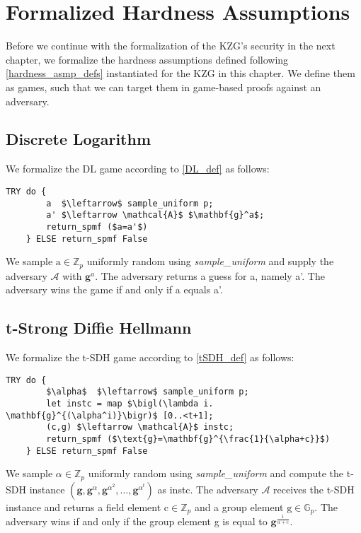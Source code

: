 \chapter{Formalized Hardness Assumptions}\label{chapter:hardness_asmps_frml}
Before we continue with the formalization of the KZG's security in the next chapter, we formalize the hardness assumptions defined following \ref{hardness_asmp_defs} instantiated for the KZG in this chapter. We define them as games, such that we can target them in game-based proofs against an adversary.

\section*{Discrete Logarithm}
We formalize the DL game according to \ref{DL_def} as follows: 
\begin{lstlisting}[language=isabelle]
    TRY do {
        a  $\leftarrow$ sample_uniform p;
        a' $\leftarrow \mathcal{A}$ $\mathbf{g}^a$;
        return_spmf ($a=a'$)
    } ELSE return_spmf False
\end{lstlisting}
We sample $\text{a} \in \mathbb{Z}_p$ uniformly random using \textit{sample\_uniform} and supply the adversary $\mathcal{A}$ with $\mathbf{g}^a$. The adversary returns a guess for a, namely a'. The adversary wins the game if and only if a equals a'.

\section*{t-Strong Diffie Hellmann}
We formalize the t-SDH game according to \ref{tSDH_def} as follows: 
\begin{lstlisting}[language=isabelle]
    TRY do {
        $\alpha$  $\leftarrow$ sample_uniform p;
        let instc = map $\bigl(\lambda i. \mathbf{g}^{(\alpha^i)}\bigr)$ [0..<t+1];
        (c,g) $\leftarrow \mathcal{A}$ instc;
        return_spmf ($\text{g}=\mathbf{g}^{\frac{1}{\alpha+c}}$)
    } ELSE return_spmf False
\end{lstlisting}
We sample $\alpha\in\mathbb{Z}_p$ uniformly random using \textit{sample\_uniform} and compute the t-SDH instance $(\mathbf{g}, \mathbf{g}^{\alpha}, \mathbf{g}^{\alpha^2}, \dots, \mathbf{g}^{\alpha^t})$ as instc. The adversary $\mathcal{A}$ receives the t-SDH instance and returns a field element $\text{c}\in\mathbb{Z}_p$ and a group element $\text{g}\in\mathbb{G}_p$. The adversary wins if and only if the group element g is equal to $\mathbf{g}^{\frac{1}{\alpha+c}}$.

